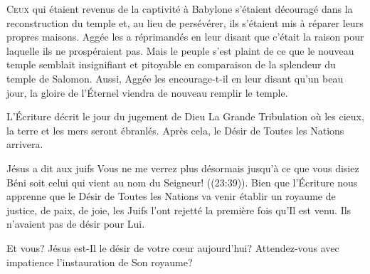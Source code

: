 


\lettrine{C}{eux} qui étaient revenus de la captivité à Babylone
 s'étaient découragé dans la reconstruction du temple et,
 au lieu de persévérer, ils s'étaient mis à réparer leurs propres maisons.
 Aggée les a réprimandés en leur disant que c'était la raison
 pour laquelle ils ne prospéraient pas. Mais le peuple s'est plaint
 de ce que le nouveau temple semblait insignifiant et pitoyable
 en comparaison de la splendeur du temple de Salomon.
 Aussi, Aggée les encourage-t-il en leur disant qu'un beau jour,
 la gloire de l'Éternel viendra de nouveau remplir le temple. 


L'Écriture décrit le jour du jugement de Dieu
 \ocadr La Grande Tribulation \fcadr{} où les cieux,
 la terre et les mers seront ébranlés. Après cela,
 le \Og Désir de Toutes les Nations \Fg{} arrivera. 

Jésus a dit aux juifs\frcolon{} 
 \Og Vous ne me verrez plus désormais jusqu'à ce que vous disiez\frcolon{}
 Béni soit celui qui vient au nom du Seigneur! \Fg{} ((23:39)).
 Bien que l'Écriture nous apprenne que \Og le Désir de Toutes les Nations \Fg{}
 va venir établir un royaume de justice, de paix, de joie, les Juifs
 l'ont rejetté la première fois qu'Il est venu.
 Ils n'avaient pas de désir pour Lui. 

Et vous? Jésus est-Il le désir de votre c\oe{}ur aujourd'hui?
 Attendez-vous avec impatience l'instauration de Son royaume? 

\dvrule




